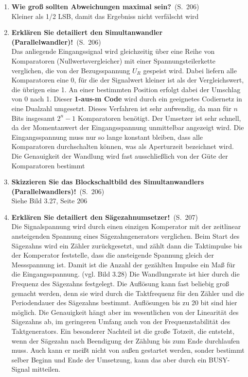 \documentclass[a4paper,12pt]{article}
\newcommand{\question}[3]{\pagebreak[3]\item {\textbf{#1?}}\ (S.\ #2)#3}
\newcommand{\statement}[3]{\pagebreak[3]\item {\textbf{#1!}}\ (S.\ #2)#3}
\newcommand{\normaltext}[1]{\\#1}
\newcommand{\page}[1]{#1}
\newcommand{\important}[1]{\textbf{#1}}
\begin{document}
\begin{enumerate}
  \question{Wie groß sollten Abweichungen maximal sein}{\page{206}}
  {
    \normaltext{Kleiner als 1/2 LSB, damit das Ergebniss nicht verfälscht wird}
  }

  \statement{Erklären Sie detailiert den Simultanwandler (Parallelwandler)}{\page{206}}
  {
    \normaltext{Das anliegende Eingangssignal wird gleichzeitig über eine Reihe von Komparatoren
                (Nullwertsvergleicher) mit einer Spannungsteilerkette verglichen, die von der
                Bezugsspannung $U_R$ gespeist wird. Dabei liefern alle Komparatoren eine 0,
                für die der Signalwert kleiner ist als der Vergleichswert, die übrigen eine 1.
                An einer bestimmten Position erfolgt dabei der Umschlag von 0 nach 1. Dieser
                \important{1-aus-m Code} wird durch ein geeignetes Codiernetz in eine Dualzahl
                umgesetzt. Dieses Verfahren ist sehr aufwendig, da man für $n$ Bits insgesamt
                $2^n - 1$ Komparatoren benötigt. Der Umsetzer ist sehr schnell, da der
                Momentanwert der Eingangsspannung unmittelbar angezeigt wird. Die Eingangsspannung
                muss nur so lange konstant bleiben, dass alle Komparatoren durchschalten können,
                was als Aperturzeit bezeichnet wird. Die Genauigkeit der Wandlung wird fast
                ausschließlich von der Güte der Komparatoren bestimmt}
  }

  \statement{Skizzieren Sie das Blockschaltbild des Simultanwandlers (Parallelwandlers)} {\page{206}}
  {
    \normaltext{Siehe Bild 3.27, Seite 206}
  }

  \statement{Erklären Sie detailiert den Sägezahnumsetzer}{\page{207}}
  {
    \normaltext{Die Signalspannung wird durch einen einzigen Komperator mit der zeitlinear 
                ansteigenden Spannung eines Sägezahngenerators verglichen. Beim Start des Sägezahns wird
                ein Zähler zurückgesetzt, und zählt dann die Taktimpulse bis der Komperator feststelle,
                dass die ansteigende Spannung gleich der Messspannung ist. Damit ist die Anzahl der 
                gezählten Impulse ein Maß für die Eingangsspannung. (vgl. Bild 3.28)
                Die Wandlungsrate ist hier durch die Frequenz des Sägezahns festgelegt. Die Auflösung kann
                fast beliebig groß gemacht werden, denn sie wird durch die Taktfrequenz für den Zähler und
                die Periodendauer des Sägezahns bestimmt. Auflösungen bis zu 20 bit sind hier möglich. Die
                Genauigkeit hängt aber im wesentlichen von der Linearität des Sägezahns ab, im geringeren
                Umfang auch von der Frequenzstabilität des Taktgenerators. Ein besonderer Nachteil ist die
                große Totzeit, die entsteht, wenn der Sägezahn nach Beendigung der Zählung bis zum Ende
                durchlaufen muss. Auch kann er meißt nicht von außen gestartet werden, sonder bestimmt selber
                Beginn und Ende der Umsetzung, kann das aber durch ein BUSY-Signal mitteilen.}
  }


\end{enumerate}
\end{document}
